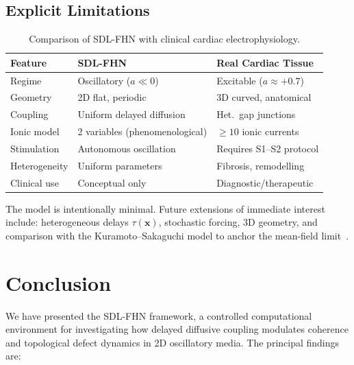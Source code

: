 \documentclass[11pt,a4paper]{article}
\begin{document}
\subsection{Explicit Limitations}

\begin{table}[htbp]
\centering
\caption{Comparison of SDL-FHN with clinical cardiac
         electrophysiology.}
\label{tab:comparison}
\begin{tabular}{@{}lll@{}}
\toprule
\textbf{Feature} & \textbf{SDL-FHN} &
  \textbf{Real Cardiac Tissue} \\
\midrule
Regime        & Oscillatory ($a \ll 0$) & Excitable ($a \approx +0.7$) \\
Geometry      & 2D flat, periodic       & 3D curved, anatomical \\
Coupling      & Uniform delayed diffusion & Het.\ gap junctions \\
Ionic model   & 2 variables (phenomenological) & ${\geq}10$ ionic currents \cite{Karma1994} \\
Stimulation   & Autonomous oscillation  & Requires S1--S2 protocol \\
Heterogeneity & Uniform parameters      & Fibrosis, remodelling \\
Clinical use  & Conceptual only         & Diagnostic/therapeutic \\
\bottomrule
\end{tabular}
\end{table}

The model is intentionally minimal. Future extensions of
immediate interest include: heterogeneous delays
$\tau(\mathbf{x})$, stochastic forcing, 3D geometry, and
comparison with the Kuramoto--Sakaguchi model to anchor
the mean-field limit~\cite{Sakaguchi1986}.

\section{Conclusion}

We have presented the SDL-FHN framework, a controlled
computational environment for investigating how delayed
diffusive coupling modulates coherence and topological defect
dynamics in 2D oscillatory media. The principal findings are:
\end{document}
